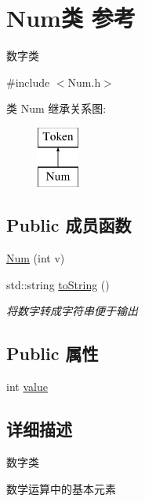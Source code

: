 \hypertarget{class_num}{}\section{Num类 参考}
\label{class_num}


数字类  




{\ttfamily \#include $<$Num.\+h$>$}

类 Num 继承关系图\+:\begin{figure}[H]
\begin{center}
\leavevmode
\includegraphics[height=2.000000cm]{class_num}
\end{center}
\end{figure}
\subsection*{Public 成员函数}
\begin{DoxyCompactItemize}
\item 
\hyperlink{class_num_afc0c5a6bc449547b300aa036e70eda2d}{Num} (int v)
\item 
\mbox{\label{class_num_aec8ab507b42f2080a8cc197f45f0c935}} 
std\+::string \hyperlink{class_num_aec8ab507b42f2080a8cc197f45f0c935}{to\+String} ()
\begin{DoxyCompactList}\small\item\em 将数字转成字符串便于输出 \end{DoxyCompactList}\end{DoxyCompactItemize}
\subsection*{Public 属性}
\begin{DoxyCompactItemize}
\item 
int \hyperlink{class_num_a40cb04ca1ed295495a2e4b358b984fb8}{value}
\end{DoxyCompactItemize}


\subsection{详细描述}
数字类 

数学运算中的基本元素 

